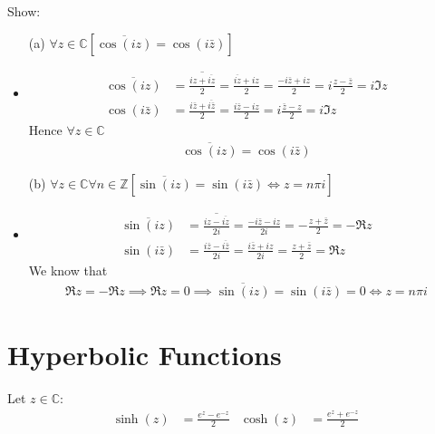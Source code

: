\documentclass[12pt, english]{book}
\makeatletter
\renewenvironment{proof}[1][\proofname]{\par
	\pushQED{\qed}%
	\normalfont \topsep6\p@\@plus6\p@\relax
	\list{}{%
		\settowidth{\leftmargin}{\itshape\proofname:\hskip\labelsep}%
		\setlength{\labelwidth}{0pt}%
		\setlength{\itemindent}{-\leftmargin}%
		}%
	\item[\hskip\labelsep\itshape#1\@addpunct{:}]\ignorespaces
	}{\popQED\endlist\@endpefalse}
\makeatother
\begin{document}
	\begin{example}
		Show: 
		\begin{itemize}
			\item[(a)] \(\forall z \in \mathbb{C}[\overline{\cos(iz)} = \cos(i\bar{z})]\) 
			\begin{proof}
			{\color{Grey}
				\begin{align*}
					\overline{\cos(iz)} 
					&= \overline{\frac{iz + \overline{iz}}{2}} = \frac{\overline{iz} + iz}{2} = \frac{-i\bar{z} + iz}{2} = i\frac{z - \bar{z}}{2} = i \Im{z}\\
					\cos(i\bar{z}) 
					&= \frac{i\bar{z} + \overline{i\bar{z}}}{2} = \frac{i\bar{z} - i z}{2} = i\frac{\bar{z} - z}{2} = i\Im{z}
				\end{align*}
				Hence \(\forall z \in \mathbb{C}\)
				\begin{align*}
					\overline{\cos(iz)} = \cos(i\bar{z})
				\end{align*}
			}
			\end{proof}
			
			\item[(b)] \(\forall z \in \mathbb{C} \forall n \in \mathbb{Z} [\overline{\sin(iz)} = \sin(i\bar{z}) \iff z = n \pi i]\) 
			\begin{proof}
			{\color{Grey}
				\begin{align*}
					\overline{\sin(iz)} 
					&= \overline{\frac{iz - \overline{iz}}{2i}} = \frac{-i\bar{z} - iz}{2i} = -\frac{z + \bar{z}}{2} = -\Re{z} \\
					\sin(i\bar{z})
					&= \frac{i\bar{z} - \overline{i\bar{z}}}{2i} = \frac{i \bar{z} + iz}{2i} = \frac{z + \bar{z}}{2} = \Re{z}
				\end{align*}
				We know that 
				\begin{align*}
					\Re{z} = -\Re{z} \implies \Re{z} = 0 \implies \overline{\sin(iz)} = \sin(i\bar{z}) = 0 \iff z = n\pi i
				\end{align*}
			}
			\end{proof}
		\end{itemize}
	\end{example}

	\section{Hyperbolic Functions} \label{Hyperbolic Functions Section - Complex}
	
	\begin{definition}
		 
		\label{Hyperbolic Sine and Cosine Functions Definition - Complex}
		Let \(z \in \mathbb{C}\):
		\begin{align*}
			\sinh(z) &= \frac{e^z - e^{-z}}{2} & \cosh(z) &= \frac{e^z + e^{-z}}{2}
		\end{align*}
	\end{definition}
	
\end{document}
